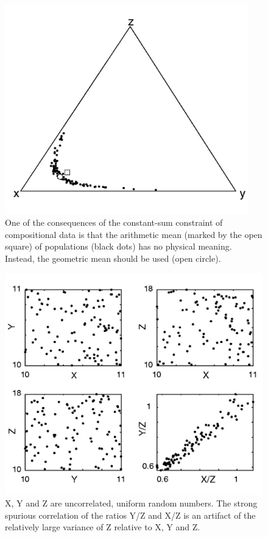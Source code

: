 \begin{figure}[htbp]
  \centering
  \includegraphics[width=400]{figures/closure.jpg}
  \caption[The consequences of the constant-sum constraint]
{One   of  the   consequences  of   the  constant-sum   constraint  of
compositional data  is that  the arithmetic mean  (marked by  the open
square) of populations (black  dots) has no physical meaning. Instead,
the geometric mean should be used (open circle).}
  \label{fig:closure}
\end{figure}

\begin{figure}[htbp]
  \centering
  \includegraphics[width=600]{figures/spurious2.jpg}
  \caption[Spurious correlation of ratios]{X, Y and Z are uncorrelated, 
uniform random numbers. The  strong spurious correlation of the ratios
Y/Z  and X/Z  is an  artifact of  the relatively  large variance  of Z
relative to X, Y and Z.}
  \label{fig:spurious}
\end{figure}


